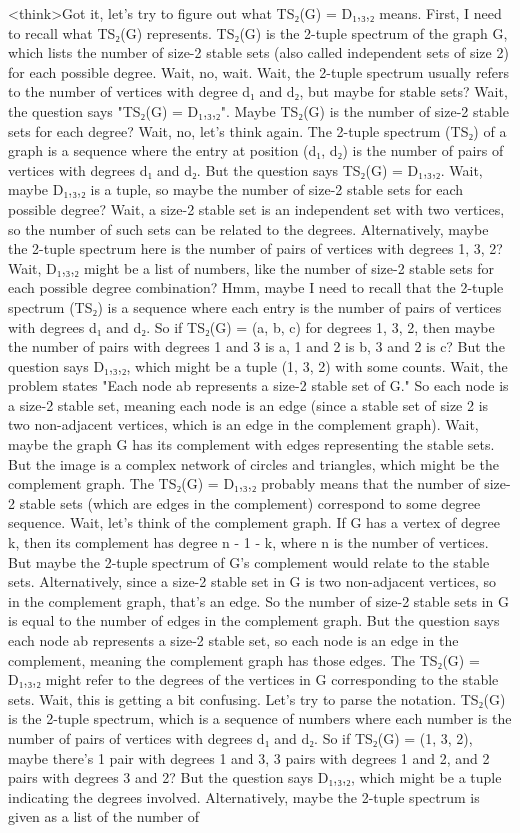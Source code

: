<think>Got it, let's try to figure out what TS₂(G) = D₁,₃,₂ means. First, I need to recall what TS₂(G) represents. TS₂(G) is the 2-tuple spectrum of the graph G, which lists the number of size-2 stable sets (also called independent sets of size 2) for each possible degree. Wait, no, wait. Wait, the 2-tuple spectrum usually refers to the number of vertices with degree d₁ and d₂, but maybe for stable sets? Wait, the question says "TS₂(G) = D₁,₃,₂". Maybe TS₂(G) is the number of size-2 stable sets for each degree? Wait, no, let's think again. The 2-tuple spectrum (TS₂) of a graph is a sequence where the entry at position (d₁, d₂) is the number of pairs of vertices with degrees d₁ and d₂. But the question says TS₂(G) = D₁,₃,₂. Wait, maybe D₁,₃,₂ is a tuple, so maybe the number of size-2 stable sets for each possible degree? Wait, a size-2 stable set is an independent set with two vertices, so the number of such sets can be related to the degrees. Alternatively, maybe the 2-tuple spectrum here is the number of pairs of vertices with degrees 1, 3, 2? Wait, D₁,₃,₂ might be a list of numbers, like the number of size-2 stable sets for each possible degree combination? Hmm, maybe I need to recall that the 2-tuple spectrum (TS₂) is a sequence where each entry is the number of pairs of vertices with degrees d₁ and d₂. So if TS₂(G) = (a, b, c) for degrees 1, 3, 2, then maybe the number of pairs with degrees 1 and 3 is a, 1 and 2 is b, 3 and 2 is c? But the question says D₁,₃,₂, which might be a tuple (1, 3, 2) with some counts. Wait, the problem states "Each node ab represents a size-2 stable set of G." So each node is a size-2 stable set, meaning each node is an edge (since a stable set of size 2 is two non-adjacent vertices, which is an edge in the complement graph). Wait, maybe the graph G has its complement with edges representing the stable sets. But the image is a complex network of circles and triangles, which might be the complement graph. The TS₂(G) = D₁,₃,₂ probably means that the number of size-2 stable sets (which are edges in the complement) correspond to some degree sequence. Wait, let's think of the complement graph. If G has a vertex of degree k, then its complement has degree n - 1 - k, where n is the number of vertices. But maybe the 2-tuple spectrum of G's complement would relate to the stable sets. Alternatively, since a size-2 stable set in G is two non-adjacent vertices, so in the complement graph, that's an edge. So the number of size-2 stable sets in G is equal to the number of edges in the complement graph. But the question says each node ab represents a size-2 stable set, so each node is an edge in the complement, meaning the complement graph has those edges. The TS₂(G) = D₁,₃,₂ might refer to the degrees of the vertices in G corresponding to the stable sets. Wait, this is getting a bit confusing. Let's try to parse the notation. TS₂(G) is the 2-tuple spectrum, which is a sequence of numbers where each number is the number of pairs of vertices with degrees d₁ and d₂. So if TS₂(G) = (1, 3, 2), maybe there's 1 pair with degrees 1 and 3, 3 pairs with degrees 1 and 2, and 2 pairs with degrees 3 and 2? But the question says D₁,₃,₂, which might be a tuple indicating the degrees involved. Alternatively, maybe the 2-tuple spectrum is given as a list of the number of 